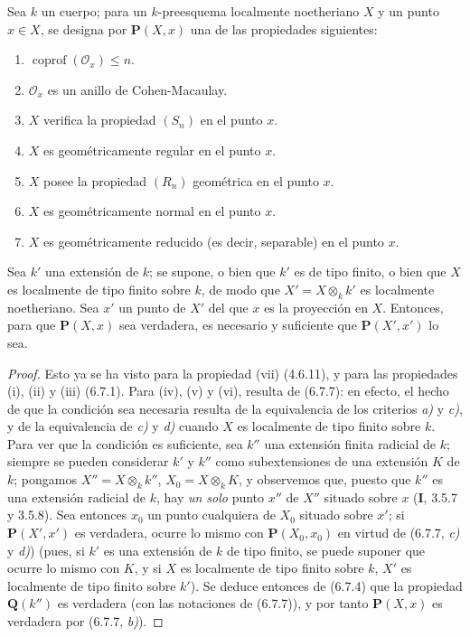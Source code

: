 \begin{corollary}[6.7.8]
\label{IV.2.s6.7.8-fr}
Sea $k$ un cuerpo; para un $k$-preesquema localmente noetheriano $X$ y un
punto $x\in X$, se designa por $\boldsymbol{P}(X,x)$ una de las propiedades siguientes:
\begin{enumerate}
\item[\textup{(i)}] $\operatorname{coprof}(\mathcal O_x)\leq n$.
\item[\textup{(ii)}] $\mathcal O_x$ es un anillo de Cohen-Macaulay.
\item[\textup{(iii)}] $X$ verifica la propiedad $(S_n)$ en el punto $x$.
\item[\textup{(iv)}] $X$ es geométricamente regular en el punto $x$.
\item[\textup{(v)}] $X$ posee la propiedad $(R_n)$ geométrica en el punto $x$.
\item[\textup{(vi)}] $X$ es geométricamente normal en el punto $x$.
\item[\textup{(vii)}] $X$ es geométricamente reducido (\textup{es decir,} separable) en el punto $x$.
\end{enumerate}
Sea $k'$ una extensión de $k$; se supone, o bien que $k'$ es de tipo finito,
o bien que $X$ es localmente de tipo finito sobre $k$, de modo que
$X'=X\otimes_k k'$ es localmente noetheriano. Sea $x'$ un punto de $X'$ del que
$x$ es la proyección en $X$. Entonces, para que $\boldsymbol{P}(X,x)$ sea verdadera, es
necesario y suficiente que $\boldsymbol{P}(X',x')$ lo sea.
\end{corollary}

\begin{proof}
Esto ya se ha visto para la propiedad (vii) (4.6.11), y para las propiedades
(i), (ii) y (iii) (6.7.1). Para (iv), (v) y (vi), resulta de (6.7.7):
en efecto, el hecho de que la condición sea necesaria resulta de la equivalencia de los
criterios \emph{a)} y \emph{c)}, y de la equivalencia de \emph{c)} y \emph{d)} cuando $X$ es localmente
de tipo finito sobre $k$. Para ver que la condición es suficiente, sea $k''$ una
extensión finita radicial de $k$; siempre se pueden considerar $k'$ y $k''$
como subextensiones de una extensión $K$ de $k$; pongamos
$X''=X\otimes_k k''$, $X_0=X\otimes_k K$, y observemos que, puesto que $k''$ es una
extensión radicial de $k$, hay \emph{un solo} punto $x''$ de $X''$ situado sobre
$x$ (\textbf I, 3.5.7 y 3.5.8). Sea entonces $x_0$ un punto cualquiera de $X_0$
situado sobre $x'$; si $\boldsymbol{P}(X',x')$ es verdadera, ocurre lo mismo con $\boldsymbol{P}(X_0,x_0)$
en virtud de (6.7.7, \emph{c)} y \emph{d)}) (pues, si $k'$ es una extensión de $k$ de tipo
finito, se puede suponer que ocurre lo mismo con $K$, y si $X$ es localmente
de tipo finito sobre $k$, $X'$ es localmente de tipo finito sobre $k'$). Se
deduce entonces de (6.7.4) que la propiedad $\boldsymbol{Q}(k'')$ es verdadera (con las notaciones de
(6.7.7)), y por tanto $\boldsymbol{P}(X,x)$ es verdadera por (6.7.7, \emph{b)}).
\end{proof}
